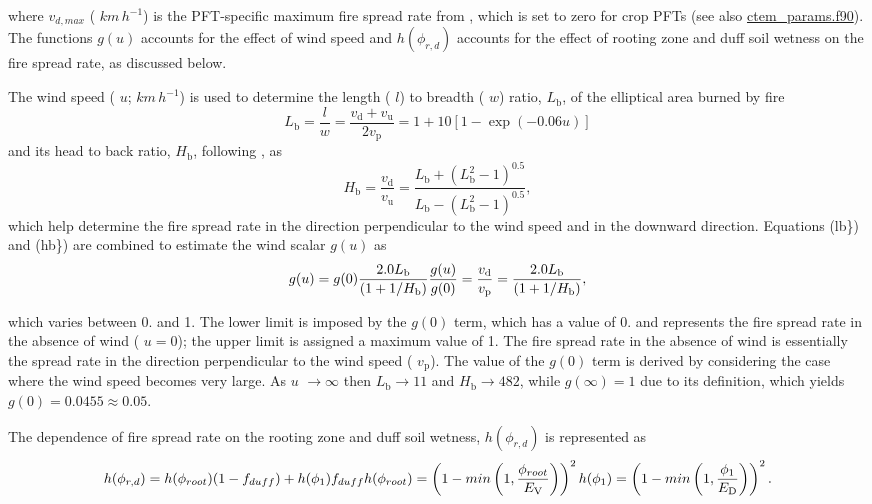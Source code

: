 where $v_{d,max}$ ( $km\,h^{-1}$) is the P\+F\+T-\/specific maximum fire spread rate from \cite{Li20121c2}, which is set to zero for crop P\+F\+Ts (see also \hyperlink{ctem__params_8f90}{ctem\+\_\+params.\+f90}). The functions $g(u)$ accounts for the effect of wind speed and $ h(\phi_{r, d})$ accounts for the effect of rooting zone and duff soil wetness on the fire spread rate, as discussed below.

The wind speed ( $u$; $km\,h^{-1}$) is used to determine the length ( $l$) to breadth ( $w$) ratio, $L_\mathrm{b}$, of the elliptical area burned by fire \[ \label{lb} L_\mathrm{b}= \frac{l}{w} = \frac{v_\mathrm{d} + v_\mathrm{u}}{2v_\mathrm{p}} = 1 + 10 [1 -\exp(-0.06 u)] \] and its head to back ratio, $H_\mathrm{b}$, following \cite{Li20121c2}, as \[ \label{hb} H_\mathrm{b} = \frac{v_\mathrm{d}}{v_\mathrm{u}} = \frac{L_\mathrm{b} + (L_\mathrm{b}^2 - 1)^{0.5}}{L_\mathrm{b} - (L_\mathrm{b}^2 - 1)^{0.5}}, \] which help determine the fire spread rate in the direction perpendicular to the wind speed and in the downward direction. Equations (lb\}) and (hb\}) are combined to estimate the wind scalar $g(u)$ as \[ g(u)= g(0) \frac{2.0 L_\mathrm{b}}{(1 + 1/H_\mathrm{b})} \nonumber\\ \frac{g(u)}{g(0)}=\frac{v_\mathrm{d}}{v_\mathrm{p}} = \frac{2.0 L_\mathrm{b}} {(1 + 1/H_\mathrm{b})}, \]

which varies between 0. and 1. The lower limit is imposed by the $g(0)$ term, which has a value of 0. and represents the fire spread rate in the absence of wind ( $u = 0$); the upper limit is assigned a maximum value of 1. The fire spread rate in the absence of wind is essentially the spread rate in the direction perpendicular to the wind speed ( $v_\mathrm{p}$). The value of the $g(0)$ term is derived by considering the case where the wind speed becomes very large. As $u$ $\rightarrow \infty$ then $L_\mathrm{b} \rightarrow 11$ and $H_\mathrm{b} \rightarrow 482$, while $g(\infty)=1$ due to its definition, which yields $g(0) = 0.0455 \approx 0.05$.

The dependence of fire spread rate on the rooting zone and duff soil wetness, $h(\phi_{r, d})$ is represented as \[ h(\phi_{r, d})= h(\phi_{root})(1-f_{duff}) + h(\phi_{1})f_{duff}\nonumber \\ h(\phi_{root})= \left(1-min \left(1,\frac{\phi_{root}}{E_\mathrm{V}} \right) \right)^2\nonumber \\ h(\phi_{1})= \left(1-min \left(1,\frac{\phi_{1}}{E_\mathrm{D}} \right) \right)^2. \]

